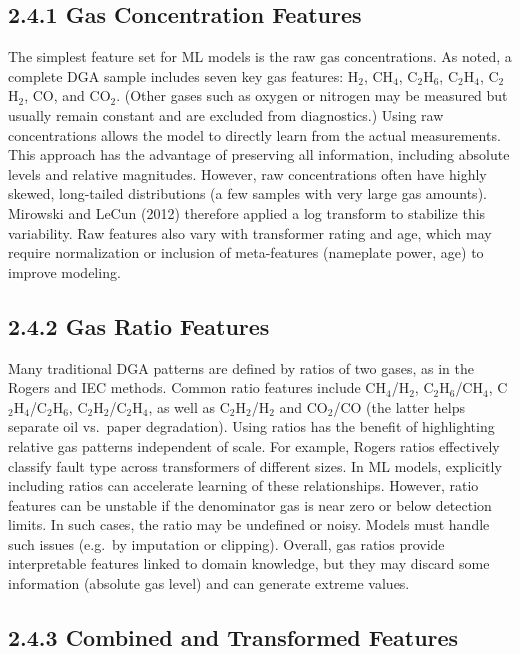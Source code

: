 \subsection{2.4.1 Gas Concentration
Features}\label{gas-concentration-features}

The simplest feature set for ML models is the raw gas concentrations. As
noted, a complete DGA sample includes seven key gas features: H$_2$, CH$_4$,
C$_2$H$_6$, C$_2$H$_4$, C$_2$H$_2$, CO, and CO$_2$. (Other gases such as oxygen or nitrogen
may be measured but usually remain constant and are excluded from
diagnostics.) Using raw concentrations allows the model to directly
learn from the actual measurements. This approach has the advantage of
preserving all information, including absolute levels and relative
magnitudes. However, raw concentrations often have highly skewed,
long-tailed distributions (a few samples with very large gas amounts).
Mirowski and LeCun (2012) therefore applied a log transform to stabilize
this variability. Raw features also vary with transformer rating and
age, which may require normalization or inclusion of meta-features
(nameplate power, age) to improve modeling.

\subsection{2.4.2 Gas Ratio Features}\label{gas-ratio-features}

Many traditional DGA patterns are defined by ratios of two gases, as in
the Rogers and IEC methods. Common ratio features include CH$_4$/H$_2$,
C$_2$H$_6$/CH$_4$, C$_2$H$_4$/C$_2$H$_6$, C$_2$H$_2$/C$_2$H$_4$, as well as C$_2$H$_2$/H$_2$ and CO$_2$/CO (the
latter helps separate oil vs.~paper degradation). Using ratios has the
benefit of highlighting relative gas patterns independent of scale. For
example, Rogers ratios effectively classify fault type across
transformers of different sizes. In ML models, explicitly including
ratios can accelerate learning of these relationships. However, ratio
features can be unstable if the denominator gas is near zero or below
detection limits. In such cases, the ratio may be undefined or noisy.
Models must handle such issues (e.g.~by imputation or clipping).
Overall, gas ratios provide interpretable features linked to domain
knowledge, but they may discard some information (absolute gas level)
and can generate extreme values.

\subsection{2.4.3 Combined and Transformed
Features}\label{combined-and-transformed-features}

